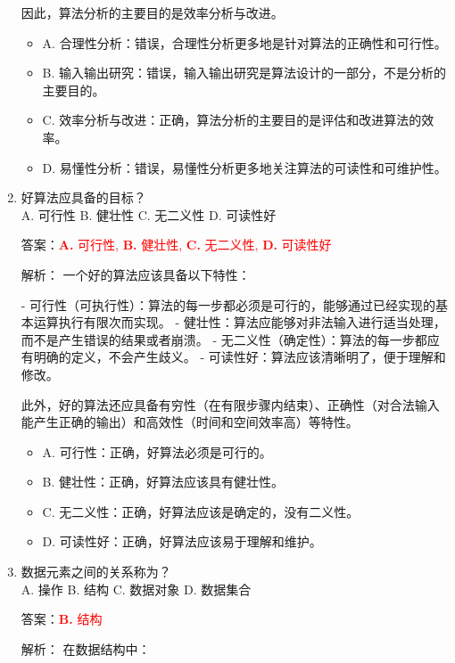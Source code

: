 \documentclass[lang=cn,newtx,10pt,scheme=chinese]{../../../elegantbook}
\begin{document}
\begin{enumerate}
    因此，算法分析的主要目的是效率分析与改进。

    \begin{itemize}
        \item A. 合理性分析：错误，合理性分析更多地是针对算法的正确性和可行性。
        \item B. 输入输出研究：错误，输入输出研究是算法设计的一部分，不是分析的主要目的。
        \item C. 效率分析与改进：正确，算法分析的主要目的是评估和改进算法的效率。
        \item D. 易懂性分析：错误，易懂性分析更多地关注算法的可读性和可维护性。
    \end{itemize}

    \item 好算法应具备的目标？\\
    A. 可行性 \quad B. 健壮性 \quad C. 无二义性 \quad D. 可读性好

    答案：\textcolor{red}{\textbf{A.} 可行性, \textbf{B.} 健壮性, \textbf{C.} 无二义性, \textbf{D.} 可读性好}

    解析：
    一个好的算法应该具备以下特性：
    
    - 可行性（可执行性）：算法的每一步都必须是可行的，能够通过已经实现的基本运算执行有限次而实现。
    - 健壮性：算法应能够对非法输入进行适当处理，而不是产生错误的结果或者崩溃。
    - 无二义性（确定性）：算法的每一步都应有明确的定义，不会产生歧义。
    - 可读性好：算法应该清晰明了，便于理解和修改。
    
    此外，好的算法还应具备有穷性（在有限步骤内结束）、正确性（对合法输入能产生正确的输出）和高效性（时间和空间效率高）等特性。

    \begin{itemize}
        \item A. 可行性：正确，好算法必须是可行的。
        \item B. 健壮性：正确，好算法应该具有健壮性。
        \item C. 无二义性：正确，好算法应该是确定的，没有二义性。
        \item D. 可读性好：正确，好算法应该易于理解和维护。
    \end{itemize}

    \item 数据元素之间的关系称为？\\
    A. 操作 \quad B. 结构 \quad C. 数据对象 \quad D. 数据集合

    答案：\textcolor{red}{\textbf{B.} 结构}

    解析：
    在数据结构中：
    

\end{enumerate}
\end{document}
